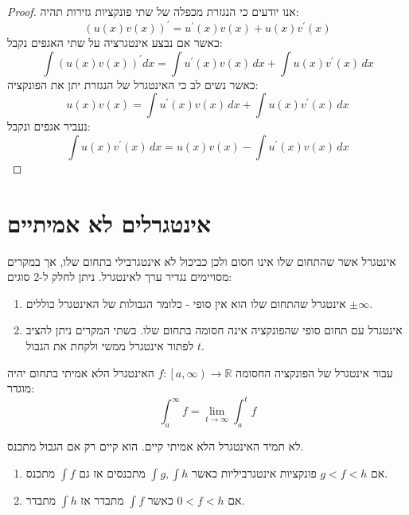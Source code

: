 \documentclass{tstextbook}
\begin{document}
\begin{proof}
אנו יודעים כי הנגזרת מכפלה של שתי פונקציות גזירות תהיה:
$$\left(u(x)v(x)\right)^{\prime}=u^{\prime}(x)v(x)+u(x)v^{\prime}(x)$$
כאשר אם נבצע אינטגרציה על שתי האגפים נקבל:
$$\int\left(u(x)v(x)\right)^{\prime}d x=\int u^{\prime}(x)v(x)\,d x+\int u(x)v^{\prime}(x)\,d x$$
כאשר נשים לב כי האינטגרל של הנגזרת יתן את הפונקציה:
$$u(x)v(x)=\int u^{\prime}(x)v(x)\,d x+\int u(x)v^{\prime}(x)\,d x$$
נעביר אגפים ונקבל:
$$\int u(x)v^{\prime}(x)\,d x=u(x)v(x)-\int u^{\prime}(x)v(x)\,d x$$

\end{proof}
\section{אינטגרלים לא אמיתיים}

\begin{definition}
אינטגרל אשר שהתחום שלו אינו חסום ולכן כביכול לא אינטגרבילי בתחום שלו, אך במקרים מסויימים נגדיר ערך לאינטגרל. ניתן לחלק ל-2 סוגים:

\end{definition}
\begin{enumerate}
  \item אינטגרל שהתחום שלו הוא אין סופי - כלומר הגבולות של האינטגרל כוללים \(\pm \infty\). 


  \item אינטגרל עם תחום סופי שהפונקציה אינה חסומה בתחום שלו. 
בשתי המקרים ניתן להציב \(t\) לפתור אינטגרל ממשי ולקחת את הגבול.


\end{enumerate}
\begin{example}
עבור אינטגרל של הפונקציה החסומה \(f:\left[ a,\infty \right)\to \mathbb{R}\) האינטגרל הלא אמיתי בתחום יהיה מוגדר:
$$\int_a^\infty f = \lim_{t\rightarrow \infty} \int_a^t f$$

\end{example}
\begin{remark}
לא תמיד האינטגרל הלא אמיתי קיים. הוא קיים רק אם הגבול מתכנס.

\end{remark}
\begin{proposition}
  \begin{enumerate}
    \item אם \(g<f<h\) פונקציות אינטגרביליות כאשר \(\int g, \int h\) מתכנסים אז גם \(\int f\) מתכנס. 


    \item אם \(0<f<h\) כאשר \(\int f\) מתבדר אז \(\int h\) מתבדר. 


  \end{enumerate}
\end{proposition}
\end{document}
